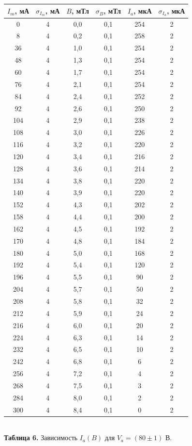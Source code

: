 \documentclass{article}
\begin{document}
\begin{center}
\begin{tabular}{|c|c|c|c|c|c|}
\hline
$I_m$, мА & $\sigma_{I_m}$, мА & $B$, мТл & $\sigma_B$, мТл & $I_a$, мкА & $\sigma_{I_a}$, мкА \\ \hline
0 & 4 & 0,0 & 0,1 & 254 & 2 \\ \hline
8 & 4 & 0,2 & 0,1 & 258 & 2 \\ \hline
36 & 4 & 1,0 & 0,1 & 254 & 2 \\ \hline
48 & 4 & 1,3 & 0,1 & 254 & 2 \\ \hline
60 & 4 & 1,7 & 0,1 & 254 & 2 \\ \hline
76 & 4 & 2,1 & 0,1 & 254 & 2 \\ \hline
84 & 4 & 2,4 & 0,1 & 252 & 2 \\ \hline
92 & 4 & 2,6 & 0,1 & 250 & 2 \\ \hline
104 & 4 & 2,9 & 0,1 & 238 & 2 \\ \hline
108 & 4 & 3,0 & 0,1 & 226 & 2 \\ \hline
116 & 4 & 3,2 & 0,1 & 220 & 2 \\ \hline
120 & 4 & 3,4 & 0,1 & 216 & 2 \\ \hline
128 & 4 & 3,6 & 0,1 & 214 & 2 \\ \hline
134 & 4 & 3,8 & 0,1 & 220 & 2 \\ \hline
140 & 4 & 3,9 & 0,1 & 220 & 2 \\ \hline
152 & 4 & 4,3 & 0,1 & 202 & 2 \\ \hline
158 & 4 & 4,4 & 0,1 & 200 & 2 \\ \hline
162 & 4 & 4,5 & 0,1 & 192 & 2 \\ \hline
170 & 4 & 4,8 & 0,1 & 184 & 2 \\ \hline
180 & 4 & 5,0 & 0,1 & 168 & 2 \\ \hline
192 & 4 & 5,4 & 0,1 & 120 & 2 \\ \hline
196 & 4 & 5,5 & 0,1 & 90 & 2 \\ \hline
204 & 4 & 5,7 & 0,1 & 50 & 2 \\ \hline
208 & 4 & 5,8 & 0,1 & 32 & 2 \\ \hline
212 & 4 & 5,9 & 0,1 & 24 & 2 \\ \hline
216 & 4 & 6,0 & 0,1 & 20 & 2 \\ \hline
224 & 4 & 6,3 & 0,1 & 14 & 2 \\ \hline
232 & 4 & 6,5 & 0,1 & 10 & 2 \\ \hline
242 & 4 & 6,8 & 0,1 & 6 & 2 \\ \hline
256 & 4 & 7,2 & 0,1 & 4 & 2 \\ \hline
268 & 4 & 7,5 & 0,1 & 3 & 2 \\ \hline
284 & 4 & 8,0 & 0,1 & 2 & 2 \\ \hline
300 & 4 & 8,4 & 0,1 & 0 & 2 \\ \hline
\end{tabular}\\
\textbf{Таблица 6.} Зависимость $I_a(B)$ для $V_a = (80 \pm 1)$ В.
\end{center}
\end{document}
